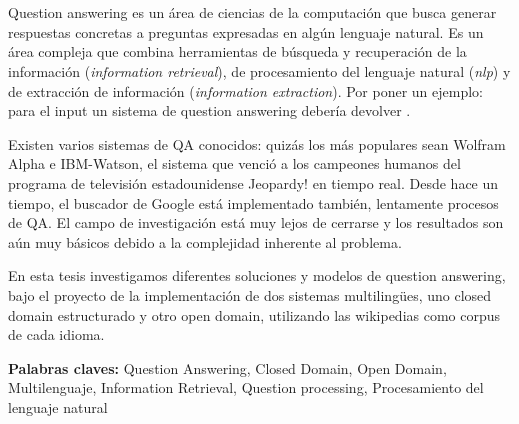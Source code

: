 \chapter*{\runtitulo}
\horrible
Question answering es un área de ciencias de la computación que busca generar respuestas concretas a preguntas expresadas en algún lenguaje natural. Es un área compleja que combina herramientas de búsqueda y recuperación de la información (\textit{information retrieval}), de procesamiento del lenguaje natural (\textit{nlp}) y de extracción de información (\textit{information extraction}). Por poner un ejemplo: para el input \textit{} un sistema de question answering debería devolver .

Existen varios sistemas de QA conocidos: quizás los más populares sean Wolfram Alpha e IBM-Watson, el sistema que venció a los campeones humanos del 
programa de televisión estadounidense Jeopardy! en tiempo real. Desde hace un tiempo, el buscador de Google está implementado también, lentamente
procesos de QA. El campo de investigación está muy lejos de cerrarse y los resultados son aún muy básicos debido a la complejidad inherente al problema. 

En esta tesis investigamos diferentes soluciones y modelos de question answering, bajo el proyecto de la implementación de dos sistemas multilingües, uno closed domain estructurado y otro open domain, utilizando las wikipedias como corpus de cada idioma. 
\bigskip

\noindent\textbf{Palabras claves:} Question Answering, Closed Domain, Open Domain, Multilenguaje, Information Retrieval, Question processing, Procesamiento del lenguaje natural
